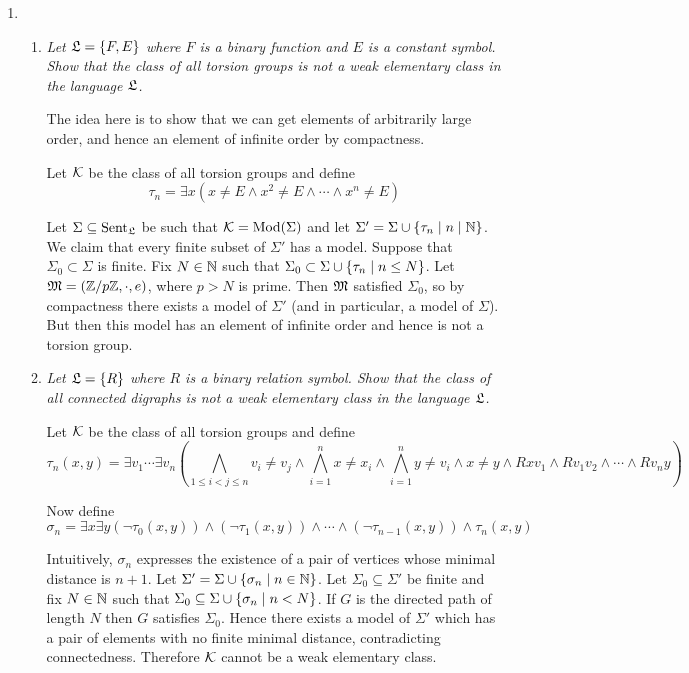 \documentclass[10pt]{article}
\begin{document}
\begin{enumerate}
\begin{enumerate}
\end{enumerate}

\item
\begin{enumerate}
\item \emph{Let $\L = \set{F, E}$ where $F$ is a binary function and $E$ is a constant symbol.  Show that the class of all torsion groups is not a weak elementary class in the language $\L$.}

The idea here is to show that we can get elements of arbitrarily large order, and hence an element of infinite order by compactness.

Let $\cal{K}$ be the class of all torsion groups and define
\[
\tau_n = \exists x (x \neq E \land x^2 \neq E \land \cdots \land x^n \neq E) 
\]

Let $\Sigma \subseteq \Sent_\L$ be such that $\cal{K} = \Mod(\Sigma)$ and let $\Sigma' = \Sigma \cup \set{\tau_n \mid n \mid \N}$.  We claim that every finite subset of $\Sigma'$ has a model.  Suppose that $\Sigma_0 \subset \Sigma$ is finite.  Fix $N \in \N$ such that $\Sigma_0 \subset \Sigma \cup \set{\tau_n \mid n \leq N}$.  Let $\M = (\Z/p\Z, \cdot, e)$, where $p > N$ is prime.  Then $\M$ satisfied $\Sigma_0$, so by compactness there exists a model of $\Sigma'$ (and in particular, a model of $\Sigma$).  But then this model has an element of infinite order and hence is not a torsion group.

\item \emph{Let $\L = \set{R}$ where $R$ is a binary relation symbol.  Show that the class of all connected digraphs is not a weak elementary class in the language $\L$.}

Let $\cal{K}$ be the class of all torsion groups and define
\[
\tau_n(x,y) = \exists v_1 \cdots \exists v_n (\bigwedge_{1 \leq i < j \leq n} v_i \neq v_j \land \bigwedge_{i=1}^n x \neq x_i \land \bigwedge_{i=1}^n y \neq v_i \land x \neq y \land Rxv_1 \land Rv_1v_2 \land \cdots \land Rv_ny)
\]

Now define
\[
\sigma_n = \exists x \exists y (\neg \tau_0(x,y)) \land (\neg \tau_1(x,y)) \land \cdots \land (\neg \tau_{n-1}(x,y)) \land \tau_n(x,y)
\]

Intuitively, $\sigma_n$ expresses the existence of a pair of vertices whose minimal distance is $n+1$.  Let $\Sigma' = \Sigma \cup \set{\sigma_n \mid n \in \N}$.  Let $\Sigma_0 \subseteq \Sigma'$ be finite and fix $N \in \N$ such that $\Sigma_0 \subseteq \Sigma \cup \set{\sigma_n \mid n < N}$.  If $G$ is the directed path of length $N$ then $G$ satisfies $\Sigma_0$.  Hence there exists a model of $\Sigma'$ which has a pair of elements with no finite minimal distance, contradicting connectedness.  Therefore $\cal{K}$ cannot be a weak elementary class.


\end{enumerate}
\end{enumerate}
\end{document}
